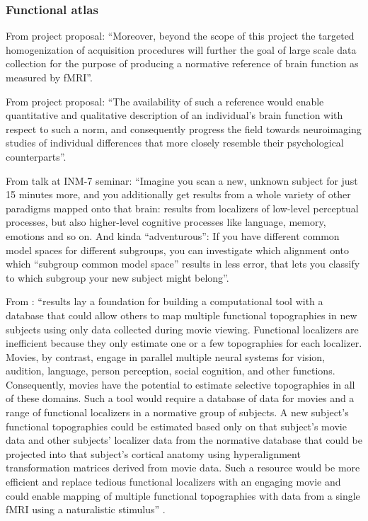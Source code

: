 \subsubsection{Functional atlas}


%
From project proposal: ``Moreover, beyond the scope of this project the targeted
homogenization of acquisition procedures will further the goal of large scale
data collection for the purpose of producing a normative reference of brain
function as measured by fMRI''.

%
From project proposal: ``The availability of such a reference would enable
quantitative and qualitative description of an individual's brain function with
respect to such a norm, and consequently progress the field towards neuroimaging
studies of individual differences that more closely resemble their psychological
counterparts''.

%
From talk at INM-7 seminar: ``Imagine you scan a new, unknown subject for just
15 minutes more, and you additionally get results from a whole variety of other
paradigms mapped onto that brain: results from localizers of low-level
perceptual processes, but also higher-level cognitive processes like language,
memory, emotions and so on. And kinda ``adventurous'': If you have different
common model spaces for different subgroups, you can investigate which alignment
onto which ``subgroup common model space'' results in less error, that lets you
classify to which subgroup your new subject might belong''.

%
From \citep{jiahui2020predicting}: ``results lay a foundation for building a
computational tool with a database that could allow others to map multiple
functional topographies in new subjects using only data collected during movie
viewing. Functional localizers are inefficient because they only estimate one or
a few topographies for each localizer. Movies, by contrast, engage in parallel
multiple neural systems for vision, audition, language, person perception,
social cognition, and other functions. Consequently, movies have the potential
to estimate selective topographies in all of these domains. Such a tool would
require a database of data for movies and a range of functional localizers in a
normative group of subjects. A new subject's functional topographies could be
estimated based only on that subject's movie data and other subjects’ localizer
data from the normative database that could be projected into that subject’s
cortical anatomy using hyperalignment transformation matrices derived from movie
data. Such a resource would be more efficient and replace tedious functional
localizers with an engaging movie and could enable mapping of multiple
functional topographies with data from a single fMRI using a naturalistic
stimulus'' \citep{jiahui2020predicting}.

